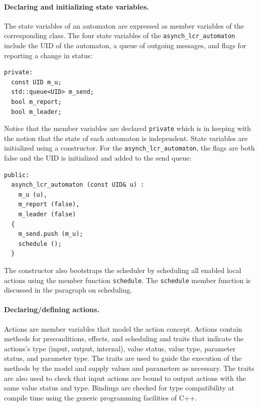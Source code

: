 \paragraph{Declaring and initializing state variables.}
The state variables of an automaton are expressed as member variables of the corresponding class.
The four state variables of the \verb+asynch_lcr_automaton+ include the UID of the automaton, a queue of outgoing messages, and flags for reporting a change in status:
\begin{lstlisting}
private:
  const UID m_u;
  std::queue<UID> m_send;
  bool m_report;
  bool m_leader;
\end{lstlisting}
Notice that the member variables are declared \verb+private+ which is in keeping with the notion that the state of each automaton is independent.
State variables are initialized using a constructor.
For the \verb+asynch_lcr_automaton+, the flags are both false and the UID is initialized and added to the send queue:
\begin{lstlisting}
public:
  asynch_lcr_automaton (const UID& u) :
    m_u (u),
    m_report (false),
    m_leader (false)
  {
    m_send.push (m_u);
    schedule ();
  }
\end{lstlisting}
The constructor also bootstraps the scheduler by scheduling all enabled local actions using the member function \verb+schedule+.
The \verb+schedule+ member function is discussed in the paragraph on scheduling.

\paragraph{Declaring/defining actions.}
Actions are member variables that model the action concept.
Actions contain methods for preconditions, effects, and scheduling and traits that indicate the actions's type (input, output, internal), value status, value type, parameter status, and parameter type.
The traits are used to guide the execution of the methods by the model and supply values and parameters as necessary.
The traits are also used to check that input actions are bound to output actions with the same value status and type.
Bindings are checked for type compatibility at compile time using the generic programming facilities of C++.

